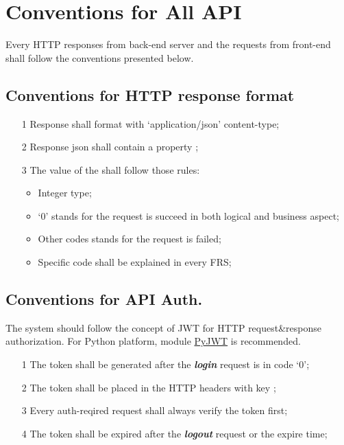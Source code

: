 \section{Conventions for All API}

 {\parindent0pt

  Every HTTP responses from back-end server and the requests from front-end shall follow the conventions presented below.

  \subsection*{Conventions for HTTP response format}

  \begin{itemize}
	  \item[1] Response shall format with \textquoteleft application/json' content-type;
	  \item[2] Response json shall contain a property ;
	  \item[3] The value of the  shall follow those rules:
		  \begin{itemize}
			  \item Integer type;
			  \item \textquoteleft 0' stands for the request is succeed in both logical and business aspect;
			  \item Other codes stands for the request is failed;
			  \item Specific code shall be explained in every FRS;
		  \end{itemize}
  \end{itemize}

  \subsection*{Conventions for API Auth.}

  The system should follow the concept of JWT for HTTP request\&response authorization.
  For Python platform, module \href{https://github.com/jpadilla/pyjwt}{PyJWT} is recommended.

  \begin{itemize}
	  \item[1] The token shall be generated after the \textit{\textbf{login}} request is in code \textquoteleft 0';
	  \item[2] The token shall be placed in the HTTP headers with key ;
	  \item[3] Every auth-reqired request shall always verify the token first;
	  \item[4] The token shall be expired after the \textit{\textbf{logout}} request or the expire time;
  \end{itemize}

}

